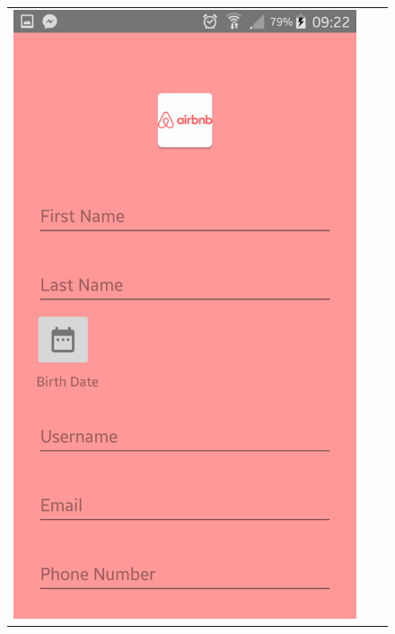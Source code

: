 \documentclass[12pt]{article}
\begin{document}
	
	\begin{center}
		\begin{figure}
			\begin{tabular}{c c c}
				
				\includegraphics[scale=0.12, keepaspectratio]{02-register01.png}  
				&

\end{tabular}
\end{figure}
\end{center}
\end{document}
